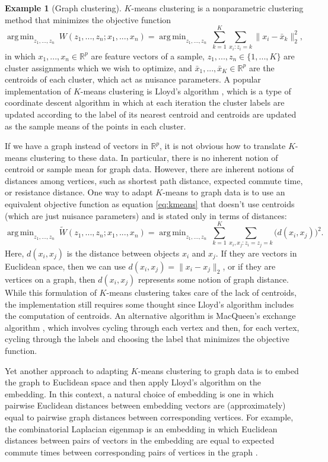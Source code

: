 \documentclass[
  11pt,
]{article}
\theoremstyle{definition}
\theoremstyle{definition}
\newtheorem{example}{Example}[section]
\theoremstyle{definition}
\theoremstyle{definition}
\theoremstyle{remark}
\begin{document}
\begin{example}[Graph clustering]
$K$-means clustering \citep{MacQueen1967} is a nonparametric clustering method that minimizes the objective function
\begin{equation}
\label{eq:kmeans}
\mathop{\mathrm{arg\,min}}_{z_1, ..., z_n} ~ W(z_1, ..., z_n; x_1, ..., x_n) = 
\mathop{\mathrm{arg\,min}}_{z_1, ..., z_n} ~ \sum_{k = 1}^K \sum_{x_i : z_i = k} \|x_i - \bar{x}_k\|_2^2,
\end{equation}
in which $x_1, ..., x_n \in \mathbb{R}^p$ are feature vectors of a sample, $z_1, ..., z_n \in \{1, ..., K\}$ are cluster assignments which we wish to optimize, and $\bar{x}_1, ..., \bar{x}_K \in \mathbb{R}^p$ are the centroids of each cluster, which act as nuisance parameters. 
A popular implementation of $K$-means clustering is Lloyd's algorithm \citep{1056489}, which is a type of coordinate descent algorithm in which at each iteration the cluster labels are updated according to the label of its nearest centroid and centroids are updated as the sample means of the points in each cluster. 

If we have a graph instead of vectors in $\mathbb{R}^p$, it is not obvious how to translate $K$-means clustering to these data. 
In particular, there is no inherent notion of centroid or sample mean for graph data. 
However, there are inherent notions of distances among vertices, such as shortest path distance, expected commute time, or resistance distance. 
One way to adapt $K$-means to graph data is to use an equivalent objective function as equation \eqref{eq:kmeans} that doesn't use centroids (which are just nuisance parameters) and is stated only in terms of distances:  
$$
\mathop{\mathrm{arg\,min}}_{z_1, ..., z_n} ~ \tilde{W}(z_1, ..., z_n; x_1, ..., x_n) =
\mathop{\mathrm{arg\,min}}_{z_1, ..., z_n} ~ \sum_{k=1}^K \sum_{x_i, x_j : z_i = z_j = k} \big( d(x_i, x_j) \big)^2.
$$
Here, $d(x_i, x_j)$ is the distance between objects $x_i$ and $x_j$. 
If they are vectors in Euclidean space, then we can use $d(x_i, x_j) = \|x_i - x_j\|_2$, 
or if they are vertices on a graph, then $d(x_i, x_j)$ represents some notion of graph distance. 
While this formulation of $K$-means clustering takes care of the lack of centroids, the implementation still requires some thought since Lloyd's algorithm includes the computation of centroids. 
An alternative algorithm is MacQueen's exchange algorithm \citep{MacQueen1967}, which involves cycling through each vertex and then, for each vertex, cycling through the labels and choosing the label that minimizes the objective function. 

Yet another approach to adapting $K$-means clustering to graph data is to embed the graph to Euclidean space and then apply Lloyd's algorithm on the embedding. 
In this context, a natural choice of embedding is one in which pairwise Euclidean distances between embedding vectors are (approximately) equal to pairwise graph distances between corresponding vertices. 
For example, the combinatorial Laplacian eigenmap is an embedding in which Euclidean distances between pairs of vectors in the embedding are equal to expected commute times between corresponding pairs of vertices in the graph \citep{vonLuxburg2007}. 
\end{example}
\end{document}
